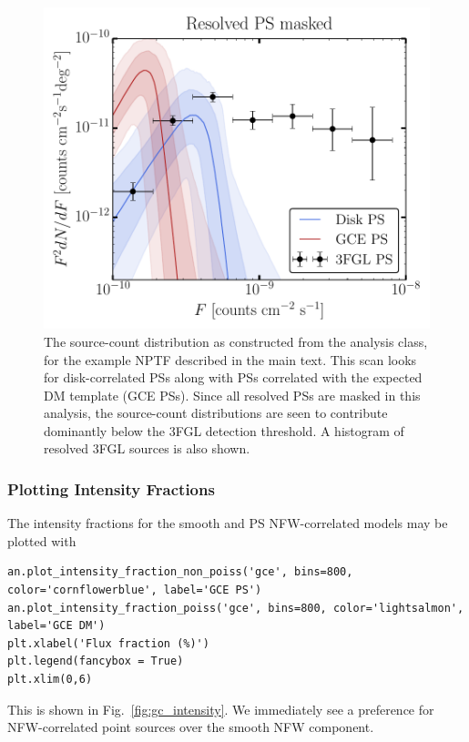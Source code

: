 \begin{figure}[htb]
\leavevmode
\begin{center}
\includegraphics[width=.8\textwidth]{ch-nptfit/dnds_masked.pdf}
\end{center}
\vspace{-.50cm}
\caption{The source-count distribution as constructed from the analysis class, for the example NPTF described in the main text.  This scan looks for  disk-correlated PSs along with PSs correlated with the expected DM template (GCE PSs).  Since all resolved PSs are masked in this analysis, the source-count distributions are seen to contribute dominantly below the 3FGL detection threshold.  A histogram of resolved 3FGL sources is also shown.}
\label{fig:gc_dndf}
\end{figure} 

\subsubsection{Plotting Intensity Fractions}

The intensity fractions for the smooth and PS NFW-correlated models may be plotted with

\begin{lstlisting}
an.plot_intensity_fraction_non_poiss('gce', bins=800, color='cornflowerblue', label='GCE PS')
an.plot_intensity_fraction_poiss('gce', bins=800, color='lightsalmon', label='GCE DM')
plt.xlabel('Flux fraction (%)')
plt.legend(fancybox = True)
plt.xlim(0,6)
\end{lstlisting}

This is shown in Fig.~\ref{fig:gc_intensity}. We immediately see a preference for NFW-correlated point sources over the smooth NFW component.

